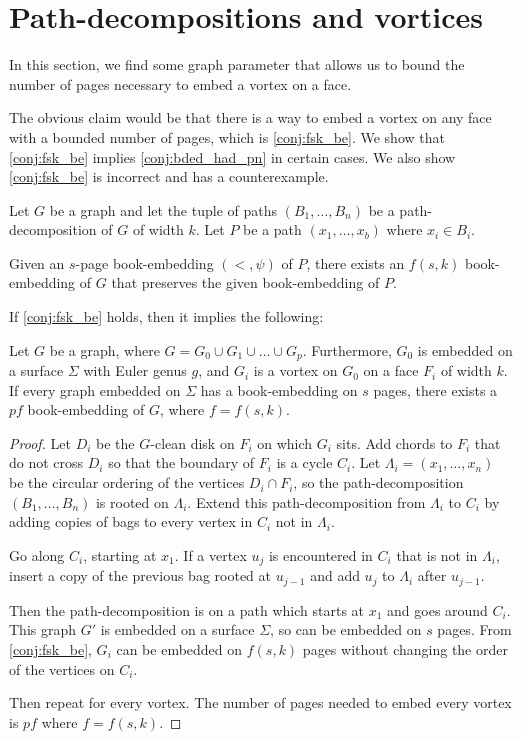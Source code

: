 \section{Path-decompositions and vortices}

In this section, we find some graph parameter that allows us to bound the number of pages necessary to embed a vortex on a face.

The obvious claim would be that there is a way to embed a vortex on any face with a bounded number of pages, which is \cref{conj:fsk_be}. We show that \cref{conj:fsk_be} implies \cref{conj:bded_had_pn} in certain cases. We also show \cref{conj:fsk_be} is incorrect and has a counterexample.
\begin{claim}\label{conj:fsk_be}
	Let $G$ be a graph and let the tuple of paths $(B_1, \ldots, B_n)$ be a path-decomposition of $G$ of width $k$. Let $P$ be a path $(x_1, \ldots, x_b)$ where $x_i \in B_i$. 

	Given an $s$-page book-embedding $(<, \psi)$ of $P$, there exists an $f(s, k)$ book-embedding of $G$ that preserves the given book-embedding of $P$.
\end{claim}

If \cref{conj:fsk_be} holds, then it implies the following:

\begin{corollary}\label{corr:fsk_be}
	Let $G$ be a graph, where $G = G_0 \cup G_1 \cup \ldots \cup G_p$. Furthermore, $G_0$ is embedded on a surface $\Sigma$ with Euler genus $g$, and $G_i$ is a vortex on $G_0$ on a face $F_i$ of width $k$. If every graph embedded on $\Sigma$ has a book-embedding on $s$ pages, there exists a $p f$ book-embedding of $G$, where $f = f(s, k)$.
\end{corollary}

\begin{proof}
	Let $D_i$ be the $G$-clean disk on $F_i$ on which $G_i$ sits. Add chords to $F_i$ that do not cross $D_i$ so that the boundary of $F_i$ is a cycle $C_i$. Let $\Lambda_i= (x_1, \ldots, x_n)$ be the circular ordering of the vertices $D_i \cap F_i$, so the path-decomposition $(B_1, \ldots , B_n)$ is rooted on $\Lambda_i$. Extend this path-decomposition from $\Lambda_i$ to $C_i$ by adding copies of bags to every vertex in $C_i$ not in $\Lambda_i$.

	Go along $C_i$, starting at $x_1$. If a vertex $u_j$ is encountered in $C_i$ that is not in $\Lambda_i$, insert a copy of the previous bag rooted at $u_{j-1}$ and add $u_j$ to $\Lambda_i$ after $u_{j-1}$.
	
	Then the path-decomposition is on a path which starts at $x_1$ and goes around $C_i$.  
	This graph $G'$ is embedded on a surface $\Sigma$, so can be embedded on $s$ pages. From \cref{conj:fsk_be}, $G_i$ can be embedded on $f(s, k)$ pages without changing the order of the vertices on $C_i$.

	Then repeat for every vortex. The number of pages needed to embed every vortex is $p f$ where $f = f(s, k)$. 
\end{proof}

